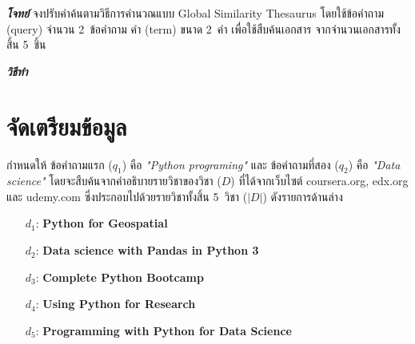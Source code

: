 \documentclass[11pt,a4paper]{article}
\newcommand{\numberOfDocument}{5}
\newcommand{\numberOfQuery}{2}
\newcommand{\numberOfTerm}{2}
\begin{document}
    \emph{\bf{โจทย์}}
        จงปรับคำค้นตามวิธีการคำนวณแบบ Global Similarity Thesaurus โดยใช้ข้อคำถาม (query) จำนวน \numberOfQuery\ ข้อคำถาม คำ (term) ขนาด \numberOfTerm\ คำ เพื่อใช้สืบค้นเอกสาร จากจำนวนเอกสารทั้งสิ้น \numberOfDocument\ ชิ้น 

    \emph{\bf{วิธีทำ}}  

    \section{จัดเตรียมข้อมูล}

    กำหนดให้ ข้อคำถามแรก ($q_1$) คือ \emph{"Python programing"} และ ข้อคำถามที่สอง ($q_2$) คือ \emph{"Data science"} โดยจะสืบค้นจากคำอธิบายรายวิชาของวิชา ($D$) ที่ได้จากเว็บไซต์ coursera.org, edx.org และ udemy.com ซึ่งประกอบไปด้วยรายวิชาทั้งสิ้น \numberOfDocument\ วิชา ($|D|$) ดังรายการด้านล่าง

    \begin{itemize}
        \item[$d_1$:] {\bf Python for Geospatial}  \\
            

        \item[$d_2$:] {\bf Data science with Pandas in Python 3}  \\
            

        \item[$d_3$:] {\bf Complete Python Bootcamp} \\
            

        \item[$d_4$:] {\bf Using Python for Research} \\
            

        \item[$d_5$:] {\bf Programming with Python for Data Science} \\
            

    \end{itemize}
\end{document}
